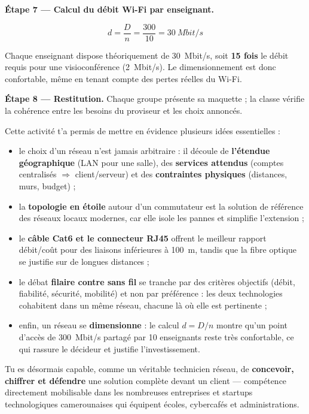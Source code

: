 \documentclass[11pt]{article}
\newcounter{popsec}
\newcounter{popsub}
\newcommand{\courssub}[1]{%
  \stepcounter{popsub}%
  \par\vspace{9pt}\noindent{\popxbold\fontsize{11.5}{13}\selectfont\color{popink}{\color{poporange}\thepopsec.\thepopsub}\hspace{6pt}#1}\par\nopagebreak\vspace{4pt}
}
\begin{document}
\begin{exoresolu}
\textbf{Étape 7 — Calcul du débit Wi-Fi par enseignant.}

\[ d = \frac{D}{n} = \frac{300}{10} = \SI{30}{Mbit/s} \]

Chaque enseignant dispose théoriquement de \SI{30}{Mbit/s}, soit \textbf{15 fois} le débit requis pour une visioconférence (\SI{2}{Mbit/s}). Le dimensionnement est donc confortable, même en tenant compte des pertes réelles du Wi-Fi.

\textbf{Étape 8 — Restitution.} Chaque groupe présente sa maquette ; la classe vérifie la cohérence entre les besoins du proviseur et les choix annoncés.
\end{exoresolu}

\courssub{Bilan de l'activité}

Cette activité t'a permis de mettre en évidence plusieurs idées essentielles :

\begin{itemize}
\item le choix d'un réseau n'est jamais arbitraire : il découle de \textbf{l'étendue géographique} (LAN pour une salle), des \textbf{services attendus} (comptes centralisés $\Rightarrow$ client/serveur) et des \textbf{contraintes physiques} (distances, murs, budget) ;
\item la \textbf{topologie en étoile} autour d'un commutateur est la solution de référence des réseaux locaux modernes, car elle isole les pannes et simplifie l'extension ;
\item le \textbf{câble Cat6 et le connecteur RJ45} offrent le meilleur rapport débit/coût pour des liaisons inférieures à \SI{100}{m}, tandis que la fibre optique se justifie sur de longues distances ;
\item le débat \textbf{filaire contre sans fil} se tranche par des critères objectifs (débit, fiabilité, sécurité, mobilité) et non par préférence : les deux technologies cohabitent dans un même réseau, chacune là où elle est pertinente ;
\item enfin, un réseau se \textbf{dimensionne} : le calcul $d = D/n$ montre qu'un point d'accès de \SI{300}{Mbit/s} partagé par 10 enseignants reste très confortable, ce qui rassure le décideur et justifie l'investissement.
\end{itemize}

Tu es désormais capable, comme un véritable technicien réseau, de \textbf{concevoir, chiffrer et défendre} une solution complète devant un client — compétence directement mobilisable dans les nombreuses entreprises et startups technologiques camerounaises qui équipent écoles, cybercafés et administrations.
\end{document}
